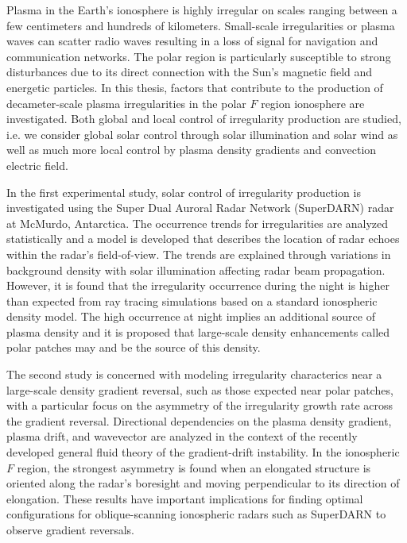 
Plasma in the Earth's ionosphere is highly irregular on scales ranging between a few centimeters and hundreds of kilometers.  Small-scale irregularities or plasma waves can scatter radio waves resulting in a loss of signal for navigation and communication networks.  The polar region is particularly susceptible to strong disturbances due to its direct connection with the Sun's magnetic field and energetic particles.  In this thesis, factors that contribute to the production of decameter-scale plasma irregularities in the polar \(F\) region ionosphere are investigated.  Both global and local control of irregularity production are studied, i.e. we consider global solar control through solar illumination and solar wind as well as much more local control by plasma density gradients and convection electric field.

In the first experimental study, solar control of irregularity production is investigated using the Super Dual Auroral Radar Network (SuperDARN) radar at McMurdo, Antarctica.  The occurrence trends for irregularities are analyzed statistically and a model is developed that describes the location of radar echoes within the radar's field-of-view.  The trends are explained through variations in background density with solar illumination affecting radar beam propagation.  However, it is found that the irregularity occurrence during the night is higher than expected from ray tracing simulations based on a standard ionospheric density model.  The high occurrence at night implies an additional source of plasma density and it is proposed that large-scale density enhancements called polar patches may and be the source of this density.

The second study is concerned with modeling irregularity characterics near a large-scale density gradient reversal, such as those expected near polar patches, with a particular focus on the asymmetry of the irregularity growth rate across the gradient reversal.  Directional dependencies on the plasma density gradient, plasma drift, and wavevector are analyzed in the context of the recently developed general fluid theory of the gradient-drift instability.  In the ionospheric \(F\) region, the strongest asymmetry is found when an elongated structure is oriented along the radar's boresight and moving perpendicular to its direction of elongation.  These results have important implications for finding optimal configurations for oblique-scanning ionospheric radars such as SuperDARN to observe gradient reversals.

